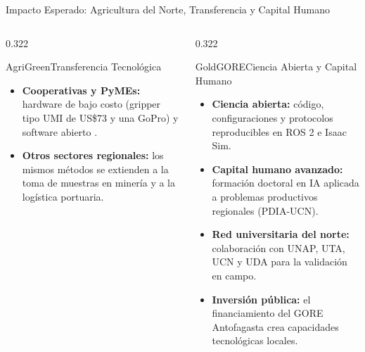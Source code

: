 \documentclass[aspectratio=169,10pt,xcolor={dvipsnames,table}]{beamer}
\newcommand{\FootnoteFont}{\fontsize{5}{6.2}\selectfont}                %
\newcommand{\CardHeightDouble}{42.5mm}     %
\newcommand{\RefNote}[1]{{\FootnoteFont\textcolor{TextDark!65}{\cite{#1}}}}
\newcommand{\NoteFont}{\fontsize{5.6}{6.9}\selectfont}                  %
\begin{document}
\begin{frame}{Impacto Esperado: Agricultura del Norte, Transferencia y Capital Humano}
\begin{columns}[T, onlytextwidth]
\begin{column}{0.322\textwidth}
\begin{Card}[height=\CardHeightDouble]{AgriGreen}{Transferencia Tecnológica}
{\begin{itemize}
          \item[\textcolor{AgriGreenDark}{$\blacktriangleright$}] \textbf{Cooperativas y PyMEs:} hardware de bajo costo (gripper tipo UMI de US\$73 y una GoPro) y software abierto \RefNote{chi2024umi}.
          \item[\textcolor{AgriGreenDark}{$\blacktriangleright$}] \textbf{Otros sectores regionales:} los mismos métodos se extienden a la toma de muestras en minería y a la logística portuaria.
        \end{itemize}}
      \end{Card}
    \end{column}
    \begin{column}{0.322\textwidth}
      \begin{Card}[height=\CardHeightDouble]{GoldGORE}{Ciencia Abierta y Capital Humano}
        {\NoteFont
        \begin{itemize}\setlength{\itemsep}{1pt}
          \item[\textcolor{GoldGORE}{$\blacktriangleright$}] \textbf{Ciencia abierta:} código, configuraciones y protocolos reproducibles en ROS 2 e Isaac Sim.
          \item[\textcolor{GoldGORE}{$\blacktriangleright$}] \textbf{Capital humano avanzado:} formación doctoral en IA aplicada a problemas productivos regionales (PDIA-UCN).
          \item[\textcolor{GoldGORE}{$\blacktriangleright$}] \textbf{Red universitaria del norte:} colaboración con UNAP, UTA, UCN y UDA para la validación en campo.
          \item[\textcolor{GoldGORE}{$\blacktriangleright$}] \textbf{Inversión pública:} el financiamiento del GORE Antofagasta crea capacidades tecnológicas locales.
        \end{itemize}}
      \end{Card}
    \end{column}
  \end{columns}
\end{frame}
\end{document}

